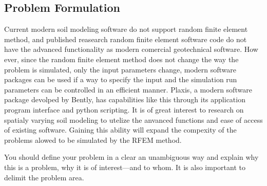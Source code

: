 \subsection*{Problem Formulation}
Current modern soil modeling software do not support random finite element method, and published reasearch random finite element software code do not have the advanced functionality as modern comercial geotechnical software.
How ever, since the random finite element method does not change the way the problem is simulated, only the input parameters change, modern software packages can be used if a way to specify the input and the simulation run parameters can be controlled in an efficient manner.
Plaxis, a modern software package devolped by Bently, has capabilities like this through its application program interface and python scripting. 
It is of great interest to research on spatialy varying soil modeling to utelize the anvanced functions and ease of access of existing software. Gaining this ability will expand the compexity of the problems alowed to be simulated by the RFEM method.


You should define your problem in a clear an unambiguous way and explain why this is a problem, why it is of interest---and to whom. It is also important to delimit the problem area.
